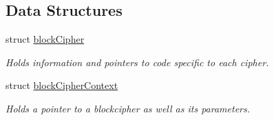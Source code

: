 \subsection*{Data Structures}
\begin{CompactItemize}
\item 
struct \hyperlink{structblockCipher}{block\-Cipher}
\begin{CompactList}\small\item\em Holds information and pointers to code specific to each cipher. \item\end{CompactList}\item 
struct \hyperlink{structblockCipherContext}{block\-Cipher\-Context}
\begin{CompactList}\small\item\em Holds a pointer to a blockcipher as well as its parameters. \item\end{CompactList}\end{CompactItemize}
